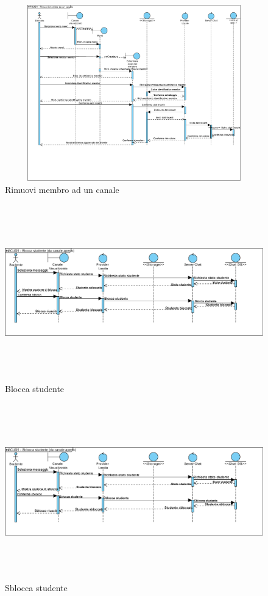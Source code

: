 \begin{figure}
	\centering
	\includegraphics[height=3in,width=5in]{imgs/gruppo6/sequence/CUD4_rimuovi_membro_ad_un_canale.pdf}
	\caption{Rimuovi membro ad un canale}
	\label{fig:prova}
\end{figure}

\begin{figure}
	\centering
	\includegraphics[height=3in,width=5in]{imgs/gruppo6/sequence/CUD5_blocca_studente.pdf}
	\caption{Blocca studente}
	\label{fig:prova}
\end{figure}

\begin{figure}
	\centering
	\includegraphics[height=3in,width=5in]{imgs/gruppo6/sequence/CUD6_sblocca_studente.pdf}
	\caption{Sblocca studente}
	\label{fig:prova}
\end{figure}

